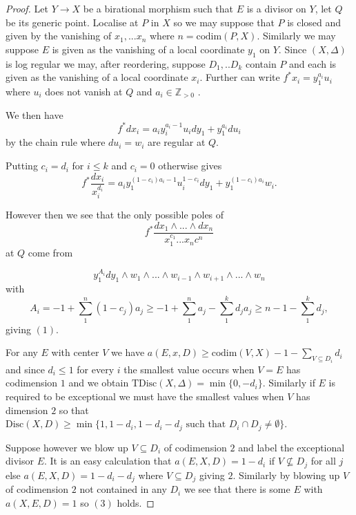 \begin{proof}
	Let $Y \to X$ be a birational morphism such that $E$ is a divisor on $Y$, let $Q$ be its generic point. Localise at $P$ in $X$ so we may suppose that $P$ is closed and given by the vanishing of $x_{1},...x_{n}$ where $n=\text{codim}(P,X)$. Similarly we may suppose $E$ is given as the vanishing of a local coordinate $y_{1}$ on $Y$. Since $(X,\Delta)$ is log regular we may, after reordering, suppose $D_{1},..D_{k}$ contain $P$ and each is given as the vanishing of a local coordinate $x_{i}$. Further can write $f^{*}x_{i}=y_{1}^{a_{i}}u_{i}$ where $u_{i}$ does not vanish at $Q$ and $a_{i}\in \mathbb{Z}_{>0}$ .
	
	We then have $$f^{*}dx_{i}=a_{i}y_{i}^{a_{i}-1}u_{i}dy_{1} + y_{1}^{a_{i}}du_{i}$$ by the chain rule where $du_{i}=w_{i}$ are regular at $Q$.
	
	Putting $c_{i}=d_{i}$ for $i \leq k$ and $c_{i}=0$ otherwise gives
	$$f^{*}\frac{dx_{i}}{x_{i}^{d_{i}}}=a_{i}y_{1}^{(1-c_{i})a_{i}-1}u_{i}^{1-c_{i}}dy_{1} +y_{1}^{(1-c_{i})a_{i}}w_{i}.$$
	
	However then we see that the only possible poles of 
	$$f^{*}\frac{dx_{1}\wedge...\wedge dx_{n}}{x_{1}^{c_{1}}...x_{n}c^{n}}$$
	at $Q$ come from 
	
	$$y_{1}^{A_{i}}dy_{1}\wedge w_{1}\wedge ... \wedge w_{i-1} \wedge w_{i+1} \wedge... \wedge w_{n}$$
	with $$A_{i}=-1+ \sum_{1}^{n} (1-c_{j})a_{j} \geq -1+\sum _{1}^{n}a_{j} -\sum_{1}^{k} d_{j}a_{j} \geq n -1 - \sum_{1}^{k} d_{j},$$ giving $(1)$.
	
	For any $E$ with center $V$ we have $a(E,x,D) \geq \text{codim}(V,X) -1 - \sum_{V \subseteq D_{i}} d_{i}$ and since $d_{i} \leq 1$ for every $i$ the smallest value occurs when $V=E$ has codimension $1$ and we obtain $\text{TDisc}(X,\Delta)=\min\{0,-d_{i}\}$. Similarly if $E$ is required to be exceptional we must have the smallest values when $V$ has dimension $2$ so that $\text{Disc}(X,D)\geq \min\{1,1-d_{i},1-d_{i}-d_{j} \text{ such that }D_{i}\cap D_{j} \neq \emptyset\}$.
	
	 Suppose however we blow up $V\subseteq D_{i}$ of codimension $2$ and label the exceptional divisor $E$. It is an easy calculation that $a(E,X,D)=1-d_{i}$ if $V\not\subseteq D_{j}$ for all $j$ else $a(E,X,D)=1-d_{i}-d_{j}$ where $V \subseteq D_{j}$ giving $2$. Similarly by blowing up $V$ of codimension $2$ not contained in any $D_{i}$ we see that there is some $E$ with $a(X,E,D)=1$ so $(3)$ holds.
	 
\end{proof}



